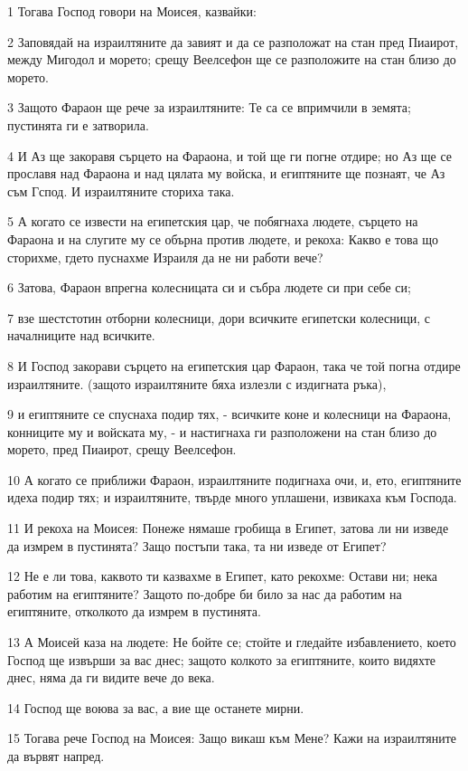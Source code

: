 \par 1 Тогава Господ говори на Моисея, казвайки:
\par 2 Заповядай на израилтяните да завият и да се разположат на стан пред Пиаирот, между Мигодол и морето; срещу Веелсефон ще се разположите на стан близо до морето.
\par 3 Защото Фараон ще рече за израилтяните: Те са се впримчили в земята; пустинята ги е затворила.
\par 4 И Аз ще закоравя сърцето на Фараона, и той ще ги погне отдире; но Аз ще се прославя над Фараона и над цялата му войска, и египтяните ще познаят, че Аз съм Гспод. И израилтяните сториха така.
\par 5 А когато се извести на египетския цар, че побягнаха людете, сърцето на Фараона и на слугите му се обърна против людете, и рекоха: Какво е това що сторихме, гдето пуснахме Израиля да не ни работи вече?
\par 6 Затова, Фараон впрегна колесницата си и събра людете си при себе си;
\par 7 взе шестстотин отборни колесници, дори всичките египетски колесници, с началниците над всичките.
\par 8 И Господ закорави сърцето на египетския цар Фараон, така че той погна отдире израилтяните. (защото израилтяните бяха излезли с издигната ръка),
\par 9 и египтяните се спуснаха подир тях, - всичките коне и колесници на Фараона, конниците му и войската му, - и настигнаха ги разположени на стан близо до морето, пред Пиаирот, срещу Веелсефон.
\par 10 А когато се приближи Фараон, израилтяните подигнаха очи, и, ето, египтяните идеха подир тях; и израилтяните, твърде много уплашени, извикаха към Господа.
\par 11 И рекоха на Моисея: Понеже нямаше гробища в Египет, затова ли ни изведе да измрем в пустинята? Защо постъпи така, та ни изведе от Египет?
\par 12 Не е ли това, каквото ти казвахме в Египет, като рекохме: Остави ни; нека работим на египтяните? Защото по-добре би било за нас да работим на египтяните, отколкото да измрем в пустинята.
\par 13 А Моисей каза на людете: Не бойте се; стойте и гледайте избавлението, което Господ ще извърши за вас днес; защото колкото за египтяните, които видяхте днес, няма да ги видите вече до века.
\par 14 Господ ще воюва за вас, а вие ще останете мирни.
\par 15 Тогава рече Господ на Моисея: Защо викаш към Мене? Кажи на израилтяните да вървят напред.
